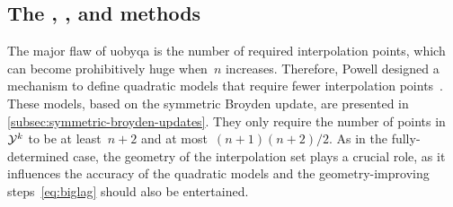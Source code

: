 \subsection{The , , and  methods}
\label{subsec:newuoa-bobyqa-lincoa}

The major flaw of \gls{uobyqa} is the number of required interpolation points, which can become prohibitively huge when~$n$ increases.
Therefore, Powell designed a mechanism to define quadratic models that require fewer interpolation points~\cite{Powell_2004a}.
These models, based on the symmetric Broyden update, are presented in \cref{subsec:symmetric-broyden-updates}.
They only require the number of points in~$\xpt[k]$ to be at least~$n + 2$ and at most~$(n + 1)(n + 2) / 2$.
As in the fully-determined case, the geometry of the interpolation set plays a crucial role, as it influences the accuracy of the quadratic models and the geometry-improving steps~\cref{eq:biglag} should also be entertained.

